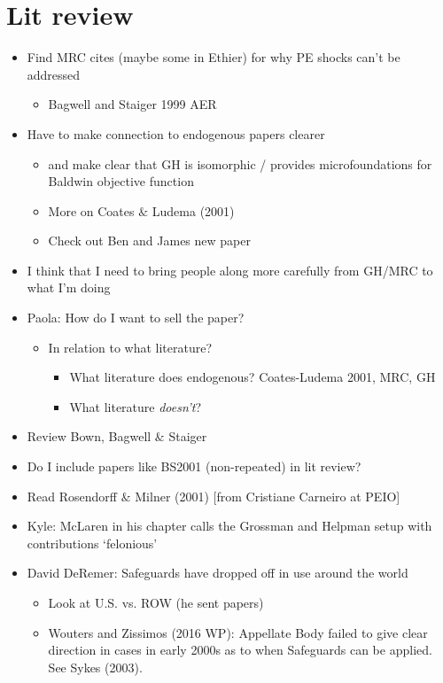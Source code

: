 \documentclass[12pt]{article}
\begin{document}
\section{Lit review}
\begin{itemize}
	\item Find MRC cites (maybe some in Ethier) for why PE shocks can't be addressed
		\begin{itemize}
			\item Bagwell and Staiger 1999 AER
		\end{itemize}
	\item Have to make connection to endogenous papers clearer
		\begin{itemize}
			\item and make clear that GH is isomorphic / provides microfoundations for Baldwin objective function
			\item More on Coates $\&$ Ludema (2001)
			\item Check out Ben and James new paper
		\end{itemize}
	\item I think that I need to bring people along more carefully from GH/MRC to what I'm doing
	\item Paola: How do I want to sell the paper?
		\begin{itemize}
			\item In relation to what literature?
				\begin{itemize}
					\item What literature does endogenous? Coates-Ludema 2001, MRC, GH
					\item What literature \textit{doesn't}?
				\end{itemize}
			\end{itemize}
	\item Review Bown, Bagwell $\&$ Staiger
	\item Do I include papers like BS2001 (non-repeated) in lit review?
	\item Read Rosendorff $\&$ Milner (2001) [from Cristiane Carneiro at PEIO]
	\item Kyle: McLaren in his chapter calls the Grossman and Helpman setup with
	 contributions `felonious'
	\item David DeRemer: Safeguards have dropped off in use around the world
		\begin{itemize}
			\item Look at U.S. vs. ROW (he sent papers)
			\item Wouters and Zissimos (2016 WP): Appellate Body failed to give clear direction in cases in early 2000s as to when Safeguards can be applied. See Sykes (2003).

\end{itemize}
\end{itemize}
\end{document}
